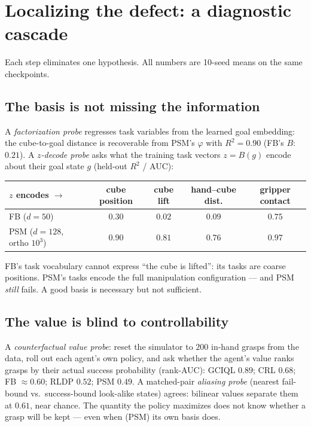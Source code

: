 \documentclass[11pt,a4paper]{article}
\begin{document}
\section{Localizing the defect: a diagnostic cascade}\label{sec:cascade}

Each step eliminates one hypothesis. All numbers are 10-seed means on the same checkpoints.

\subsection{The basis is not missing the information}\label{sec:basis}
A \emph{factorization probe} regresses task variables from the learned goal embedding: the
cube-to-goal distance is recoverable from PSM's $\varphi$ with $R^{2}=0.90$ (FB's $B$: $0.21$).
A \emph{$z$-decode probe} asks what the training task vectors $z=B(g)$ encode about their goal
state $g$ (held-out $R^{2}$ / AUC):
\begin{center}\small
\begin{tabular}{@{}lcccc@{}}
\toprule
$z$ encodes $\to$ & cube position & cube lift & hand--cube dist. & gripper contact\\
\midrule
FB ($d{=}50$) & $0.30$ & $\mathbf{0.02}$ & $0.09$ & $0.75$\\
PSM ($d{=}128$, ortho $10^{3}$) & $0.90$ & $\mathbf{0.81}$ & $0.76$ & $0.97$\\
\bottomrule
\end{tabular}
\end{center}
FB's task vocabulary cannot express ``the cube is lifted'': its tasks are coarse positions. PSM's
tasks encode the full manipulation configuration --- and PSM \emph{still} fails. A good basis is
necessary but not sufficient.

\subsection{The value is blind to controllability}\label{sec:blind}
A \emph{counterfactual value probe}: reset the simulator to $200$ in-hand grasps from the data,
roll out each agent's own policy, and ask whether the agent's value ranks grasps by their actual
success probability (rank-AUC): GCIQL $0.89$; CRL $0.68$; FB $\approx0.60$; RLDP $0.52$; PSM
$0.49$. A matched-pair \emph{aliasing probe} (nearest fail-bound vs.\ success-bound look-alike
states) agrees: bilinear values separate them at $0.61$, near chance. The quantity the policy
maximizes does not know whether a grasp will be kept --- even when (PSM) its own basis does.
\end{document}
